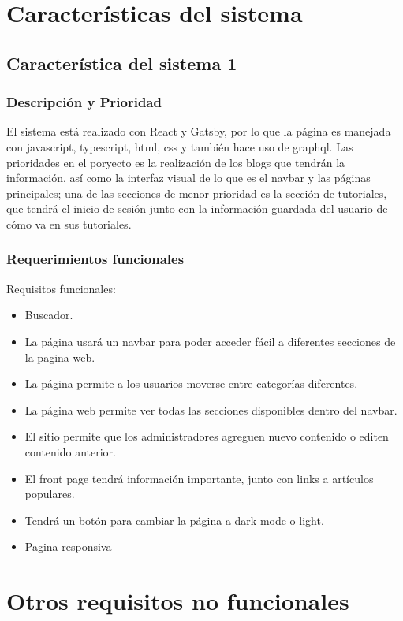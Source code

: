 \documentclass{scrreprt}
\begin{document}
	\chapter{Características del sistema}
		\section{Característica del sistema 1}
			
			\subsection{Descripción y Prioridad}
El sistema está realizado con React y Gatsby, por lo que la página es manejada con javascript, typescript, html, css y también hace uso de graphql. Las prioridades en el poryecto es la realización de los blogs que tendrán la información, así como la interfaz visual de lo que es el navbar y las páginas principales; una de las secciones de menor prioridad es la sección de tutoriales, que tendrá el inicio de sesión junto con la información guardada del usuario de cómo va en sus tutoriales.
			
			\subsection{Requerimientos funcionales}
Requisitos funcionales:
\begin{itemize}
	\item Buscador.
	\item La página usará un navbar para poder acceder fácil a diferentes secciones de la pagina web.
	\item La página permite a los usuarios moverse entre categorías diferentes.
	\item La página web permite ver todas las secciones disponibles dentro del navbar.
	\item El sitio permite que los administradores agreguen nuevo contenido o editen contenido anterior.
	\item El front page tendrá información importante, junto con links a artículos populares.
	\item Tendrá un botón para cambiar la página a dark mode o light.
	\item Pagina responsiva
\end{itemize}
		
	\chapter{Otros requisitos no funcionales}
	
\end{document}
